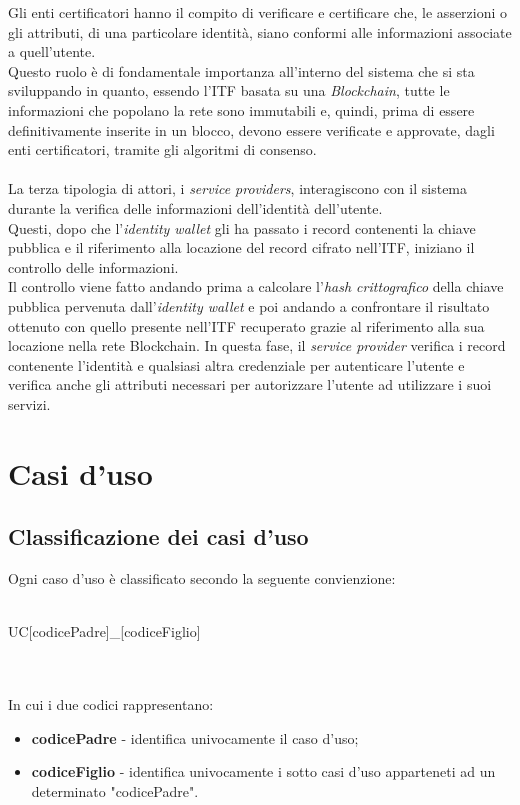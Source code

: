 Gli enti certificatori hanno il compito di verificare e certificare che, le asserzioni o gli attributi, di una particolare identità, siano conformi alle informazioni associate a quell'utente.\\
Questo ruolo è di fondamentale importanza all'interno del sistema che si sta sviluppando in quanto, essendo l'\gls{ITF} basata su una \textit{Blockchain}, tutte le informazioni che popolano la rete sono immutabili e, quindi, prima di essere definitivamente inserite in un blocco, devono essere verificate e approvate, dagli enti certificatori, tramite gli algoritmi di consenso.\\\\
La terza tipologia di attori, i \textit{service providers}, interagiscono con il sistema durante la verifica delle informazioni dell'identità dell'utente.\\
Questi, dopo che l'\textit{identity wallet} gli ha passato i record contenenti la chiave pubblica e il riferimento alla locazione del record cifrato nell'\gls{ITF}, iniziano il  controllo delle informazioni.\\
Il controllo viene fatto andando prima a calcolare l'\textit{hash crittografico} della chiave pubblica pervenuta dall'\textit{identity wallet} e poi andando a confrontare il risultato ottenuto con quello presente nell'\gls{ITF} recuperato grazie al riferimento alla sua locazione nella rete Blockchain.
In questa fase, il \textit{service provider} verifica i record contenente l'identità e qualsiasi altra credenziale per autenticare l'utente e verifica anche gli attributi necessari per autorizzare l'utente ad utilizzare i suoi servizi.
\section{Casi d'uso}
\subsection{Classificazione dei casi d'uso}
Ogni caso d'uso è classificato secondo la seguente convienzione:\\\\
\centerline{UC[codicePadre]\_[codiceFiglio]}\\\\
In cui i due codici rappresentano:
\begin{itemize}
	\item \textbf{codicePadre} - identifica univocamente il caso d'uso;
	\item \textbf{codiceFiglio} - identifica univocamente i sotto casi d'uso apparteneti ad un determinato "codicePadre".
\end{itemize}

